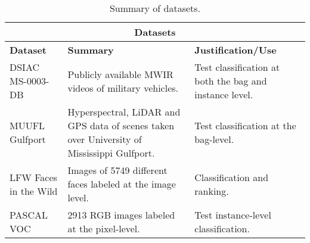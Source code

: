 \begin{longtable}{ |p{4cm}|p{6cm}|p{4cm}|  } 
	\caption{Summary of datasets.}
	\label{tab:Datasets}\\
	\hline
	\multicolumn{3}{|c|}{\textbf{Datasets}} \\
	\hline
	\textbf{Dataset} & \textbf{Summary} & \textbf{Justification/Use}\\
	\hline
	DSIAC MS-0003-DB   &  Publicly available MWIR videos of military vehicles. & Test classification at both the bag and instance level.   \\
	\hline
	MUUFL Gulfport &  Hyperspectral, LiDAR and GPS data of scenes taken over University of Mississippi Gulfport. & Test classification at the bag-level.   \\
	\hline
	LFW Faces in the Wild & Images of 5749 different faces labeled at the  image level. & Classification and ranking. \\
	\hline
	PASCAL VOC  & 2913 RGB images labeled at the pixel-level. & Test instance-level classification. \\
	\hline
\end{longtable}